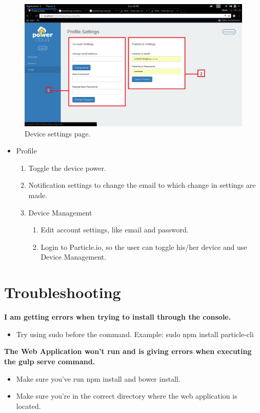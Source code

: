 \documentclass[a4paper,10pt]{article}
\begin{document}
		\begin{figure}[H]
			\includegraphics[width=\textwidth]{images/Profile.png}
			\caption{Device settings page. \label{overflow}}
		\end{figure}		
		\begin{itemize}
			\item Profile
			\begin{enumerate}
				\item Toggle the device power.
				\item Notification settings to change the email to which change in settings are made.
				\item Device Management
				\begin{enumerate}
					\item Edit account settings, like email and password.
					\item Login to Particle.io, so the user can toggle his/her device and use Device Management.
				\end{enumerate}
			\end{enumerate}
		\end{itemize}
	
	\newpage
	\section{Troubleshooting}
	\textbf{I am getting errors when trying to install through the console.}
	\begin{itemize}
		\item Try using sudo before the command. Example: sudo npm install particle-cli
	\end{itemize}
	
	\textbf{The Web Application won't run and is giving errors when executing the gulp serve command.} 
	\begin{itemize}
		\item Make sure you've run npm install and bower install.
		\item Make sure you're in the correct directory where the web application is located.
	\end{itemize}
\end{document}
